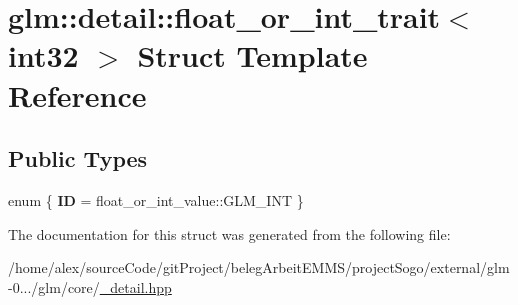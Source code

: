 \hypertarget{structglm_1_1detail_1_1float__or__int__trait_3_01int32_01_4}{\section{glm\-:\-:detail\-:\-:float\-\_\-or\-\_\-int\-\_\-trait$<$ int32 $>$ Struct Template Reference}
\label{structglm_1_1detail_1_1float__or__int__trait_3_01int32_01_4}
}
\subsection*{Public Types}
\begin{DoxyCompactItemize}
\item 
enum \{ {\bfseries I\-D} = float\-\_\-or\-\_\-int\-\_\-value\-:\-:G\-L\-M\-\_\-\-I\-N\-T
 \}
\end{DoxyCompactItemize}


The documentation for this struct was generated from the following file\-:\begin{DoxyCompactItemize}
\item 
/home/alex/source\-Code/git\-Project/beleg\-Arbeit\-E\-M\-M\-S/project\-Sogo/external/glm-\/0.../glm/core/\hyperlink{__detail_8hpp}{\-\_\-detail.\-hpp}\end{DoxyCompactItemize}
